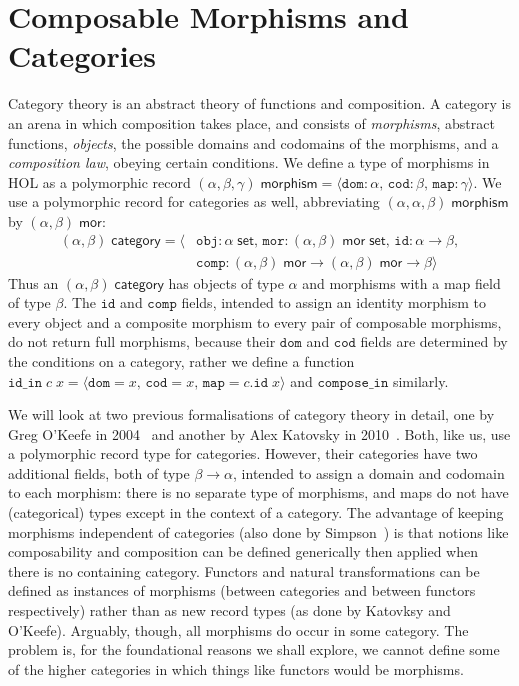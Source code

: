 \documentclass[twoside,titlepage,11pt]{article}
\begin{document}
\section{Composable Morphisms and Categories}%
Category theory is an abstract theory of functions and composition.
A category is an arena in which composition takes place, and consists of \emph{morphisms}, abstract functions, \emph{objects}, the possible domains and codomains of the morphisms, and a \emph{composition law}, obeying certain conditions.
We define a type of morphisms in HOL as a polymorphic record $(\alpha,\beta,\gamma)\;\mathsf{morphism}=\langle\mathtt{dom}:\alpha,\,\mathtt{cod}:\beta,\,\mathtt{map}:\gamma\rangle$.
We use a polymorphic record for categories as well, abbreviating $(\alpha,\alpha,\beta)\;\mathsf{morphism}$ by $(\alpha,\beta)\;\mathsf{mor}$:
\begin{align*}
(\alpha,\beta)\;\mathsf{category}=\langle&\mathtt{obj}:\alpha\;\mathsf{set},\,\mathtt{mor}:(\alpha,\beta)\;\mathsf{mor}\;\mathsf{set},\,\mathtt{id}:\alpha\to\beta,\\&\mathtt{comp}:(\alpha,\beta)\;\mathsf{mor}\to(\alpha,\beta)\;\mathsf{mor}\to\beta\rangle
\end{align*}
Thus an $(\alpha,\beta)\;\mathsf{category}$ has objects of type $\alpha$ and morphisms with a map field of type $\beta$.
The $\mathtt{id}$ and $\mathtt{comp}$ fields, intended to assign an identity morphism to every object and a composite morphism to every pair of composable morphisms, do not return full morphisms, because their $\mathtt{dom}$ and $\mathtt{cod}$ fields are determined by the conditions on a category, rather we define a function $\mathtt{id\_in}\;c\;x=\langle\mathtt{dom}=x,\,\mathtt{cod}=x,\,\mathtt{map}=c.\mathtt{id}\;x\rangle$ and $\mathtt{compose\_in}$ similarly.

We will look at two previous formalisations of category theory in detail, one by Greg O'Keefe in 2004~\cite{DBLP:journals/entcs/OKeefe04} and another by Alex Katovsky in 2010~\cite{Katovsky}.
Both, like us, use a polymorphic record type for categories.
However, their categories have two additional fields, both of type $\beta\to\alpha$, intended to assign a domain and codomain to each morphism: there is no separate type of morphisms, and maps do not have (categorical) types except in the context of a category.
The advantage of keeping morphisms independent of categories (also done by Simpson~\cite{Simpson04}) is that notions like composability and composition can be defined generically then applied when there is no containing category.
Functors and natural transformations can be defined as instances of morphisms (between categories and between functors respectively) rather than as new record types (as done by Katovksy and O'Keefe).
Arguably, though, all morphisms do occur in some category.
The problem is, for the foundational reasons we shall explore, we cannot define some of the higher categories in which things like functors would be morphisms.
\end{document}
